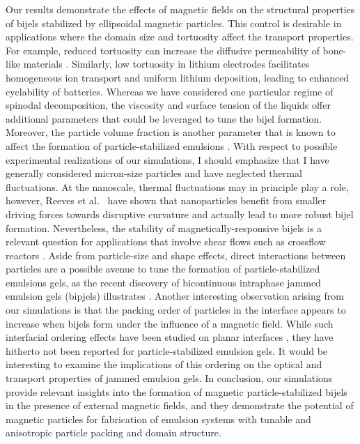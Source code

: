 Our results demonstrate the effects of magnetic fields on the structural
properties of bijels stabilized by ellipsoidal magnetic particles. This
control is desirable in applications where the domain size and
tortuosity affect the transport properties. For example, reduced
tortuosity can increase the diffusive permeability of bone-like
materials \cite{prakoso2023tortuosity}. Similarly, low tortuosity
in lithium electrodes facilitates homogeneous ion transport and
uniform lithium deposition, leading to enhanced cyclability of
batteries\cite{chen_tortuosity_2020, ebner_tortuosity_2014}. Whereas we
have considered one particular regime of spinodal decomposition, the
viscosity and surface tension of the liquids offer additional parameters
that could be leveraged to tune the bijel formation. Moreover, the
particle volume fraction is another parameter that is known to affect
the formation of particle-stabilized emulsions
\cite{jansen_bijels_2011,hijnen_bijels_2015}. With respect to possible
experimental realizations of our simulations, I should emphasize that
I have generally considered micron-size particles and have neglected
thermal fluctuations. At the nanoscale, thermal fluctuations may in
principle play a role, however, Reeves et
al.~\cite{reeves_particle-size_2015} have shown that nanoparticles
benefit from smaller driving forces towards disruptive curvature and
actually lead to more robust bijel formation. Nevertheless, the
stability of magnetically-responsive bijels is a relevant question for
applications that involve shear flows such as crossflow reactors
\cite{khan_nanostructured_2022}. Aside from particle-size and shape
effects, direct interactions between particles are a possible avenue
to tune the formation of particle-stabilized emulsions gels, as the
recent discovery of bicontinuous intraphase jammed emulsion gels
(bipjels) illustrates \cite{kinkead_bicontinuous_2019}. Another
interesting observation arising from our simulations is that the
packing order of particles in the interface appears to increase when
bijels form under the influence of a magnetic field. While such
interfacial ordering effects have been studied on planar interfaces
\cite{toor_self-assembly_2016,shi_nanoparticle_2018,kim_dynamic_2022},
they have hitherto not been reported for particle-stabilized emulsion
gels. It would be interesting to examine the implications of this
ordering on the optical and transport properties of jammed emulsion
gels. In conclusion, our simulations provide relevant insights into the
formation of magnetic particle-stabilized bijels in the presence of
external magnetic fields, and they demonstrate the potential of magnetic
particles for fabrication of emulsion systems with tunable and
anisotropic particle packing and domain structure.